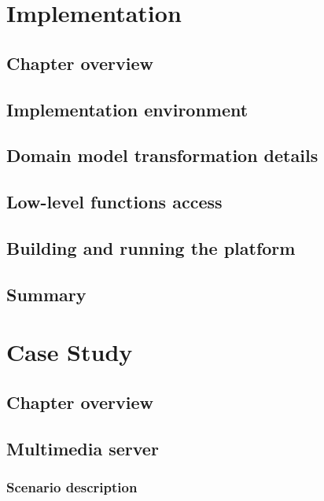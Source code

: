 \documentclass[11pt]{book}
\begin{document}
  \chapter{Implementation}
    
    \section*{Chapter overview}


    \section{Implementation environment}


    \section{Domain model transformation details}


    \section{Low-level functions access}


    \section{Building and running the platform}


    \section*{Summary}


  \chapter{Case Study}

    \section*{Chapter overview}


    \section{Multimedia server}

      \subsection{Scenario description}
\end{document}
